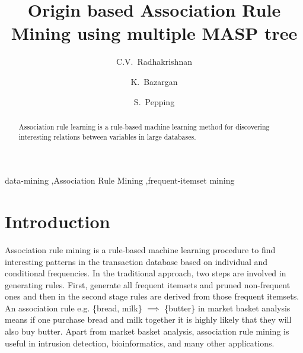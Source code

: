 \documentclass[preprint]{elsarticle}
\begin{document}
\begin{frontmatter}
\title{Origin based Association Rule Mining using multiple MASP tree}

\author[rvt]{C.V.~Radhakrishnan}
\author[rvt,focal]{K.~Bazargan}
\author[els]{S.~Pepping}


\address[rvt]{River Valley Technologies, SJP Building, Cotton Hills, Trivandrum, Kerala, India 695014}
\address[focal]{River Valley Technologies, 9, Browns Court, Kennford, Exeter, United Kingdom}
\address[els]{Central Application Management, Elsevier, Radarweg 29, 1043 NX\\ Amsterdam, Netherlands}

\begin{abstract}
Association rule learning is a rule-based machine learning method for discovering interesting relations between variables in large databases.
\end{abstract}

\begin{keyword}
data-mining \sep Association Rule Mining \sep frequent-itemset mining 
\end{keyword}

\end{frontmatter}

\section{Introduction}
Association rule mining is a rule-based machine learning procedure to find interesting patterns in the transaction database based on individual and conditional frequencies. In the traditional approach, two steps are involved in generating rules. First, generate all frequent itemsets and pruned non-frequent ones and then in the second stage rules are derived from those frequent itemsets. An association rule e.g. \{bread, milk\} $\implies$ \{butter\} in market basket analysis means if one purchase bread and milk together it is highly likely that they will also buy butter. Apart from market basket analysis, association rule mining is useful in intrusion detection, bioinformatics, and many other applications.
\end{document}
